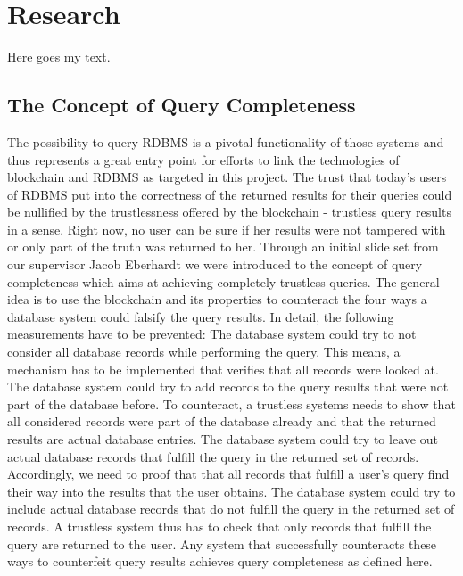 \section{Research}

Here goes my text.

\subsection{The Concept of Query Completeness}
The possibility to query RDBMS is a pivotal functionality of those systems and thus represents a great entry point for efforts to link the technologies of blockchain and RDBMS as targeted in this project. The trust that today’s users of RDBMS put into the correctness of the returned results for their queries could be nullified by the trustlessness offered by the blockchain - trustless query results in a sense. Right now, no user can be sure if her results were not tampered with or only part of the truth was returned to her.
Through an initial slide set from our supervisor Jacob Eberhardt we were introduced to the concept of query completeness which aims at achieving completely trustless queries. The general idea is to use the blockchain and its properties to counteract the four ways a database system could falsify the query results. In detail, the following measurements have to be prevented:
The database system could try to not consider all database records while performing the query. This means, a mechanism has to be implemented that verifies that all records were looked at.
The database system could try to add records to the query results that were not part of the database before. To counteract, a trustless systems needs to show that all considered records were part of the database already and that the returned results are actual database entries.
The database system could try to leave out actual database records that fulfill the query in the returned set of records. Accordingly, we need to proof that that all records that fulfill a user’s query find their way into the results that the user obtains.
The database system could try to include actual database records that do not fulfill the query in the returned set of records. A trustless system thus has to check that only records that fulfill the query are returned to the user.
Any system that successfully counteracts these ways to counterfeit query results achieves query completeness as defined here.

